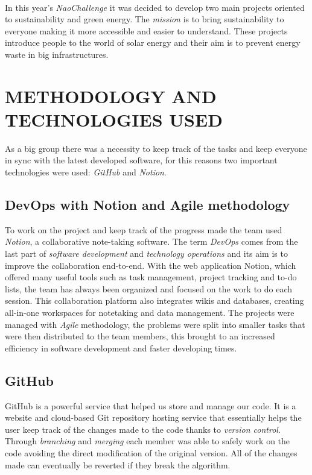 \documentclass{optica-article}
\begin{document}
\begin{abstract*} 
\vspace{7pt}
\noindent
\\In this year's \emph{NaoChallenge} it was decided to develop two main projects oriented to sustainability and green energy. The \emph{mission} is to bring sustainability to everyone making it more accessible and easier to understand. These projects introduce people to the world of solar energy and their aim is to prevent energy waste in big infrastructures.\\

\section{METHODOLOGY AND TECHNOLOGIES USED}\label{sec:methodology_technologies}
As a big group there was a necessity to keep track of the tasks and keep everyone in sync with the latest developed software, for this reasons two important technologies were used: \emph{GitHub} and \emph{Notion}.

\subsection{DevOps with Notion and Agile methodology}\label{sec:devops_notion}
To work on the project and keep track of the progress made the team used \emph{Notion}, a collaborative note-taking software. The term \emph{DevOps} comes from the last part of \emph{software development} and \emph{technology operations} and its aim is to improve the collaboration end-to-end. With the web application Notion, which offered many useful tools such as task management, project tracking and to-do lists, the team has always been organized and focused on the work to do each session. This collaboration platform also integrates wikis and databases, creating all-in-one workspaces for notetaking and data management. The projects were managed with \emph{Agile} methodology, the problems were split into smaller tasks that were then distributed to the team members, this brought to an increased efficiency in software development and faster developing times.

\subsection{GitHub}\label{sec:git_hub}
GitHub is a powerful service that helped us store and manage our code. It is a website and cloud-based Git repository hosting service that essentially helps the user keep track of the changes made to the code thanks to \emph{version control}.\\
Through \emph{branching} and \emph{merging} each member was able to safely work on the code avoiding the direct modification of the original version. All of the changes made can eventually be reverted if they break the algorithm.


\end{abstract*}
\end{document}
